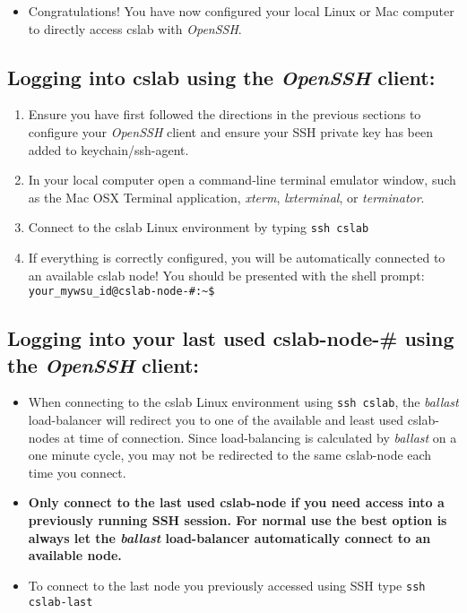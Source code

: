 \documentclass[12pt]{article}
\begin{document}
\begin{flushleft}
\begin{itemize}
  \item Congratulations! You have now configured your local Linux or Mac computer to directly access cslab with \textit{OpenSSH}.
\end{itemize}

\subsection*{Logging into cslab using the \textit{OpenSSH} client:}
\begin{enumerate}
  \item Ensure you have first followed the directions in the previous sections to configure your \textit{OpenSSH} client and ensure your SSH private key has been added to keychain/ssh-agent.
  \item In your local computer open a command-line terminal emulator window, such as the Mac OSX Terminal application, \textit{xterm}, \textit{lxterminal}, or \textit{terminator}.
  \item Connect to the cslab Linux environment by typing \break
    \verb|ssh cslab|
  \item If everything is correctly configured, you will be automatically connected to an available cslab node! You should be presented with the shell prompt: \break
    \verb|your_mywsu_id@cslab-node-#:~$|
\end{enumerate}

\newpage
\subsection*{Logging into your last used cslab-node-\# using the \textit{OpenSSH} client:}
\begin{itemize}
  \item When connecting to the cslab Linux environment using \verb|ssh cslab|, the \textit{ballast} load-balancer will redirect you to one of the available and least used cslab-nodes at time of connection. Since load-balancing is calculated by \textit{ballast} on a one minute cycle, you may not be redirected to the same cslab-node each time you connect.

  \item \textbf{Only connect to the last used cslab-node if you need access into a previously running SSH session. For normal use the best option is always let the \textit{ballast} load-balancer automatically connect to an available node.}
  \item To connect to the last node you previously accessed using SSH type \break
  \verb|ssh cslab-last|
\end{itemize}


\end{flushleft}
\end{document}
